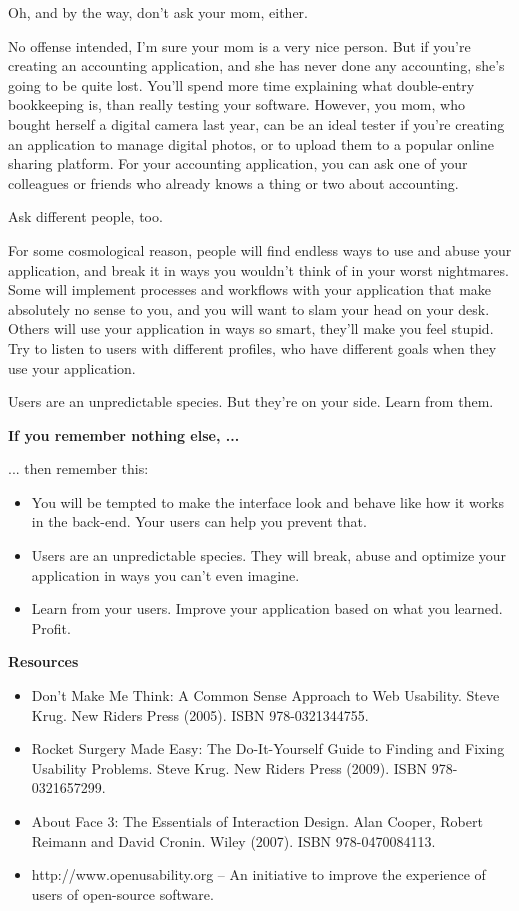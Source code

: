 Oh, and by the way, don't ask your mom, either.

No offense intended, I'm sure your mom is a very nice person. But if you're creating an accounting application, and she has never done any accounting, she's going to be quite lost. You'll spend more time explaining what double-entry bookkeeping is, than really testing your software. However, you mom, who bought herself a digital camera last year, can be an ideal tester if you're creating an application to manage digital photos, or to upload them to a popular online sharing platform. For your accounting application, you can ask one of your colleagues or friends who already knows a thing or two about accounting.

Ask different people, too.

For some cosmological reason, people will find endless ways to use and abuse your application, and break it in ways you wouldn't think of in your worst nightmares. Some will implement processes and workflows with your application that make absolutely no sense to you, and you will want to slam your head on your desk. Others will use your application in ways so smart, they'll make you feel stupid. Try to listen to users with different profiles, who have different goals when they use your application.

Users are an unpredictable species. But they're on your side. Learn from them.

\textbf{If you remember nothing else, ...}

... then remember this:
\begin{itemize}
 \item You will be tempted to make the interface look and behave like how it works in the back-end. Your users can help you prevent that.
 \item Users are an unpredictable species. They will break, abuse and optimize your application in ways you can't even imagine.
 \item Learn from your users. Improve your application based on what you learned. Profit.
\end{itemize}

\textbf{Resources}
\begin{itemize}
 \item  Don't Make Me Think: A Common Sense Approach to Web Usability. Steve Krug. New Riders Press (2005). ISBN 978-0321344755.
 \item Rocket Surgery Made Easy: The Do-It-Yourself Guide to Finding and Fixing Usability Problems. Steve Krug. New Riders Press (2009). ISBN 978-0321657299.
 \item About Face 3: The Essentials of Interaction Design. Alan Cooper, Robert Reimann and David Cronin. Wiley (2007). ISBN 978-0470084113.
 \item http://www.openusability.org – An initiative to improve the experience of users of open-source software.
\end{itemize}
